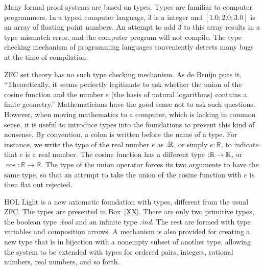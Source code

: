 \documentclass{llncs}
\def\tc{\hbox{:}}
\newcommand{\ring}[1]{\mathbb{#1}}
\begin{document}
Many
formal proof systems  are based on
types.  Types are familiar to computer programmers.  In a typed computer language,
$3$ is a integer and $[1.0;2.0;3.0]$ is an array of floating point numbers. An attempt
to add $3$ to this array results in a type mismatch error, and the computer program
will not compile.  The type checking mechanism of programming languages
conveniently detects many bugs at the time
of compilation.  %


ZFC set theory has no such type checking mechanism.  As de Bruijn
puts it,
``Theoretically, it seems perfectly legitimate
to ask whether the union of the cosine function
and the number $e$ (the basis of natural
logarithms) contains a finite geometry.''
Mathematicians have the good sense not to ask such questions.  However, when moving
mathematics to a computer, which is lacking in common sense, it is useful to introduce types
into the foundations
to prevent this kind of nonsense.  By convention,  a colon is written before the name of a type.  For instance, we write the type of the real number $e$ as $\tc\ring{R}$, or simply $e:\ring{R}$, to indicate that $e$ is a real number.
The cosine function has a different type $\tc\ring{R}\to\ring{R}$,
or $\cos:\ring{R}\to\ring{R}$.
The type of the union operator 
forces its two arguments to have the same type,
so that an attempt to take the union of the cosine function with $e$ is then flat out rejected.

HOL Light is a new axiomatic foundation with types, 
 different from the usual ZFC.
The types are presented in Box~\ref{XX}.  There are only two primitive
types, the boolean type {\it \tc bool} and an infinite type {\it \tc ind}. The rest are formed
with type variables and composition arrows.
A mechanism is also provided for creating a new type
that is in bijection with a nonempty subset of another type,
allowing the system
to be extended with types for ordered pairs, integers, rational numbers, real numbers,
and so forth.
\end{document}

